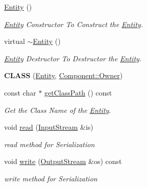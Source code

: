 \begin{DoxyCompactItemize}
\item 
\hyperlink{class_i_dream_sky_1_1_entity_a980f368aa07ce358583982821533a54a}{Entity} ()\hypertarget{class_i_dream_sky_1_1_entity_a980f368aa07ce358583982821533a54a}{}\label{class_i_dream_sky_1_1_entity_a980f368aa07ce358583982821533a54a}

\begin{DoxyCompactList}\small\item\em \hyperlink{class_i_dream_sky_1_1_entity}{Entity} Constructor To Construct the \hyperlink{class_i_dream_sky_1_1_entity}{Entity}. \end{DoxyCompactList}\item 
virtual \hyperlink{class_i_dream_sky_1_1_entity_adf6d3f7cb1b2ba029b6b048a395cc8ae}{$\sim$\+Entity} ()\hypertarget{class_i_dream_sky_1_1_entity_adf6d3f7cb1b2ba029b6b048a395cc8ae}{}\label{class_i_dream_sky_1_1_entity_adf6d3f7cb1b2ba029b6b048a395cc8ae}

\begin{DoxyCompactList}\small\item\em \hyperlink{class_i_dream_sky_1_1_entity}{Entity} Destructor To Destructor the \hyperlink{class_i_dream_sky_1_1_entity}{Entity}. \end{DoxyCompactList}\item 
{\bfseries C\+L\+A\+SS} (\hyperlink{class_i_dream_sky_1_1_entity}{Entity}, \hyperlink{class_i_dream_sky_1_1_component_1_1_owner}{Component\+::\+Owner})\hypertarget{class_i_dream_sky_1_1_entity_a67ca2af6e4b64fe6b51aaa7cdf7ca2b9}{}\label{class_i_dream_sky_1_1_entity_a67ca2af6e4b64fe6b51aaa7cdf7ca2b9}

\item 
const char $\ast$ \hyperlink{class_i_dream_sky_1_1_entity_a47a29754f7e29daaaf069b287c2d76e7}{get\+Class\+Path} () const 
\begin{DoxyCompactList}\small\item\em Get the Class Name of the \hyperlink{class_i_dream_sky_1_1_entity}{Entity}. \end{DoxyCompactList}\item 
void \hyperlink{class_i_dream_sky_1_1_entity_a58873f05c2fca4c91c92924f9be753c9}{read} (\hyperlink{class_i_dream_sky_1_1_input_stream}{Input\+Stream} \&is)
\begin{DoxyCompactList}\small\item\em read method for Serialization \end{DoxyCompactList}\item 
void \hyperlink{class_i_dream_sky_1_1_entity_a10741436b8c23a174df4918577ad593c}{write} (\hyperlink{class_i_dream_sky_1_1_output_stream}{Output\+Stream} \&os) const 
\begin{DoxyCompactList}\small\item\em write method for Serialization \end{DoxyCompactList}\end{DoxyCompactItemize}
